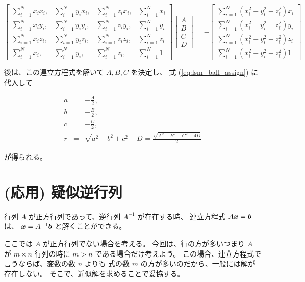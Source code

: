 \documentclass[12pt]{jsarticle}
\def\sumdata{\sum_{i=1}^{N}}
\begin{document}
\begin{equation}
  \begin{bmatrix}
    \sumdata x_i x_i, & \sumdata y_i x_i, & \sumdata z_i x_i, & \sumdata x_i \\
    \sumdata x_i y_i, & \sumdata y_i y_i, & \sumdata z_i y_i, & \sumdata y_i \\
    \sumdata x_i z_i, & \sumdata y_i z_i, & \sumdata z_i z_i, & \sumdata z_i \\
    \sumdata x_i,     & \sumdata y_i,     & \sumdata z_i,     & \sumdata 1
  \end{bmatrix}
  \begin{bmatrix}
    A \\ B \\ C \\ D
  \end{bmatrix}
  = -
  \begin{bmatrix}
    \sumdata \left( x_i^2 + y_i^2 + z_i^2 \right) x_i \\
    \sumdata \left( x_i^2 + y_i^2 + z_i^2 \right) y_i \\
    \sumdata \left( x_i^2 + y_i^2 + z_i^2 \right) z_i \\
    \sumdata \left( x_i^2 + y_i^2 + z_i^2 \right) 1
  \end{bmatrix}
\end{equation}

後は、この連立方程式を解いて $A, B, C$ を決定し、
式 (\ref{eq:lsm_ball_assign}) に代入して

\begin{eqnarray}
  a &=& - \frac{A}{2}, \\
  b &=& - \frac{B}{2}, \\
  c &=& - \frac{C}{2}, \\
  r &=& \sqrt{a^2 + b^2 + c^2- D} = \frac{\sqrt{A^2 + B^2 + C^2 - 4D}}{2}
\end{eqnarray}

が得られる。

\section{(応用) 疑似逆行列}

行列 $A$ が正方行列であって、逆行列 $A^{-1}$ が存在する時、
連立方程式 $A \bm{x} = \bm{b}$ は、
$\bm{x} = A^{-1} \bm{b}$
と解くことができる。

ここでは $A$ が正方行列でない場合を考える。
今回は、行の方が多いつまり $A$ が $m \times n$ 行列の時に
$m > n$ である場合だけ考えよう。
この場合、連立方程式で言うならば、変数の数 $n$ よりも
式の数 $m$ の方が多いのだから、一般には解が存在しない。
そこで、近似解を求めることで妥協する。
\end{document}
